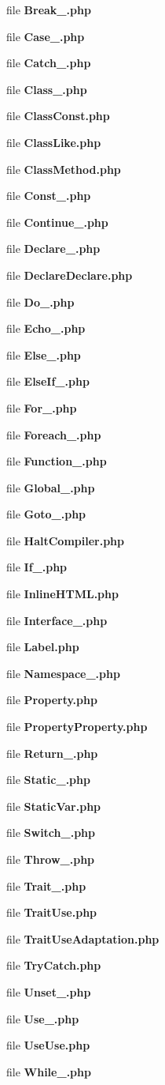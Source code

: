 \begin{DoxyCompactItemize}
\item 
file {\bf Break\+\_\+.\+php}
\item 
file {\bf Case\+\_\+.\+php}
\item 
file {\bf Catch\+\_\+.\+php}
\item 
file {\bf Class\+\_\+.\+php}
\item 
file {\bf Class\+Const.\+php}
\item 
file {\bf Class\+Like.\+php}
\item 
file {\bf Class\+Method.\+php}
\item 
file {\bf Const\+\_\+.\+php}
\item 
file {\bf Continue\+\_\+.\+php}
\item 
file {\bf Declare\+\_\+.\+php}
\item 
file {\bf Declare\+Declare.\+php}
\item 
file {\bf Do\+\_\+.\+php}
\item 
file {\bf Echo\+\_\+.\+php}
\item 
file {\bf Else\+\_\+.\+php}
\item 
file {\bf Else\+If\+\_\+.\+php}
\item 
file {\bf For\+\_\+.\+php}
\item 
file {\bf Foreach\+\_\+.\+php}
\item 
file {\bf Function\+\_\+.\+php}
\item 
file {\bf Global\+\_\+.\+php}
\item 
file {\bf Goto\+\_\+.\+php}
\item 
file {\bf Halt\+Compiler.\+php}
\item 
file {\bf If\+\_\+.\+php}
\item 
file {\bf Inline\+H\+T\+M\+L.\+php}
\item 
file {\bf Interface\+\_\+.\+php}
\item 
file {\bf Label.\+php}
\item 
file {\bf Namespace\+\_\+.\+php}
\item 
file {\bf Property.\+php}
\item 
file {\bf Property\+Property.\+php}
\item 
file {\bf Return\+\_\+.\+php}
\item 
file {\bf Static\+\_\+.\+php}
\item 
file {\bf Static\+Var.\+php}
\item 
file {\bf Switch\+\_\+.\+php}
\item 
file {\bf Throw\+\_\+.\+php}
\item 
file {\bf Trait\+\_\+.\+php}
\item 
file {\bf Trait\+Use.\+php}
\item 
file {\bf Trait\+Use\+Adaptation.\+php}
\item 
file {\bf Try\+Catch.\+php}
\item 
file {\bf Unset\+\_\+.\+php}
\item 
file {\bf Use\+\_\+.\+php}
\item 
file {\bf Use\+Use.\+php}
\item 
file {\bf While\+\_\+.\+php}
\end{DoxyCompactItemize}
